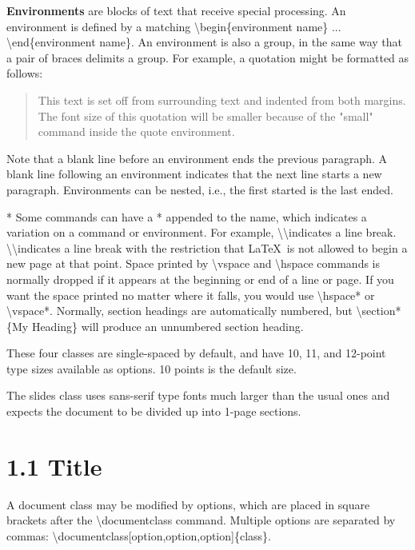 \documentclass[a4paper,11pt,UTF8,openright]{book}
\begin{document}
\textbf{Environments} are blocks of text that receive special processing. An environment is
defined by a matching \textbackslash begin\{environment name\} ... \textbackslash end\{environment name\}. An environment is also a group, in the same way that a pair of braces delimits a group. For example, a quotation might be formatted as follows:

  \begin{quote}
  \small
  This text is set off from surrounding text and indented from
  both margins. The font size of this quotation will be smaller
  because of the "small" command inside the quote environment.
  \end{quote}

Note that a blank line before an environment ends the previous paragraph. A blank
line following an environment indicates that the next line starts a new paragraph.
Environments can be nested, i.e., the first started is the last ended.

* Some commands can have a * appended to the name, which indicates a variation on a
command or environment. For example, \textbackslash\textbackslash indicates a line break. \textbackslash\textbackslash* indicates a
line break with the restriction that \LaTeX\ is not allowed to begin a new page at that
point. Space printed by \textbackslash vspace and \textbackslash hspace commands is normally dropped if it appears at the beginning or end of a line or page. If you want the space printed no matter where it falls, you would use \textbackslash hspace* or \textbackslash vspace*. Normally, section headings are automatically numbered, but \textbackslash section*\{My Heading\} will produce an unnumbered section heading.


These four classes are single-spaced by default, and have 10, 11, and 12-point type sizes
available as options. 10 points is the default size.

The slides class uses sans-serif type fonts much larger than the usual ones and expects
the document to be divided up into 1-page sections.

\section{1.1 Title}

A document class may be modified by options, which are placed in square brackets after
the \textbackslash documentclass command. Multiple options are separated by commas:
\textbackslash documentclass[option,option,option]\{class\}.
\end{document}
